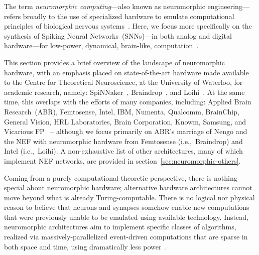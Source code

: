 The term \emph{neuromorphic computing}---also known as neuromorphic engineering---refers broadly to the use of specialized hardware to emulate computational principles of biological nervous systems~\citep{mead1989analog, liu2002analog}.
Here, we focus more specifically on the synthesis of Spiking Neural Networks~(SNNs)---in both analog and digital hardware---for low-power, dynamical, brain-like, computation~\citep{boahen2017neuromorph}.

This section provides a brief overview of the landscape of neuromorphic hardware, with an emphasis placed on state-of-the-art hardware made available to the Centre for Theoretical Neuroscience, at the University of Waterloo, for academic research, namely: SpiNNaker~\citep{furber2014spinnaker}, Braindrop~\citep{braindrop2019}, and Loihi~\citep{davies2018loihi}.
At the same time, this overlaps with the efforts of many companies, including: Applied Brain Research~(ABR), Femtosense, Intel, IBM, Numenta, Qualcomm, BrainChip, General Vision, HRL Laboratories, Brain Corporation, Knowm, Samsung, and Vicarious FP~\citep{marketreport2018, femtosense} -- although we focus primarily on ABR's marriage of Nengo and the NEF with neuromorphic hardware from Femtosense (i.e.,~Braindrop) and Intel (i.e.,~Loihi).
A non-exhaustive list of other architectures, many of which implement NEF networks, are provided in section~\ref{sec:neuromorphic-others}.

Coming from a purely computational-theoretic perspective, there is nothing special about neuromorphic hardware; alternative hardware architectures cannot move beyond what is already Turing-computable.
There is no logical nor physical reason to believe that neurons and synapses somehow enable new computations that were previously unable to be emulated using available technology.
Instead, neuromorphic architectures aim to implement specific classes of algorithms, realized via massively-parallelized event-driven computations that are sparse in both space and time, using dramatically less power~\citep{tang2017sparse}.

